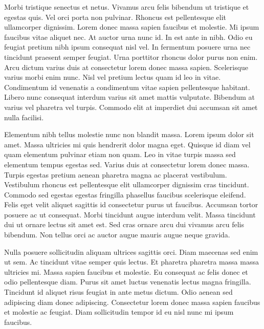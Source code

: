 \documentclass[11pt,a4paper]{article}
\begin{document}
Morbi tristique senectus et netus. Vivamus arcu felis bibendum ut tristique et egestas quis. Vel orci porta non pulvinar. Rhoncus est pellentesque elit ullamcorper dignissim. Lorem donec massa sapien faucibus et molestie. Mi ipsum faucibus vitae aliquet nec. At auctor urna nunc id. In est ante in nibh. Odio eu feugiat pretium nibh ipsum consequat nisl vel. In fermentum posuere urna nec tincidunt praesent semper feugiat. Urna porttitor rhoncus dolor purus non enim. Arcu dictum varius duis at consectetur lorem donec massa sapien. Scelerisque varius morbi enim nunc. Nisl vel pretium lectus quam id leo in vitae. Condimentum id venenatis a condimentum vitae sapien pellentesque habitant. Libero nunc consequat interdum varius sit amet mattis vulputate. Bibendum at varius vel pharetra vel turpis. Commodo elit at imperdiet dui accumsan sit amet nulla facilisi.

Elementum nibh tellus molestie nunc non blandit massa. Lorem ipsum dolor sit amet. Massa ultricies mi quis hendrerit dolor magna eget. Quisque id diam vel quam elementum pulvinar etiam non quam. Leo in vitae turpis massa sed elementum tempus egestas sed. Varius duis at consectetur lorem donec massa. Turpis egestas pretium aenean pharetra magna ac placerat vestibulum. Vestibulum rhoncus est pellentesque elit ullamcorper dignissim cras tincidunt. Commodo sed egestas egestas fringilla phasellus faucibus scelerisque eleifend. Felis eget velit aliquet sagittis id consectetur purus ut faucibus. Accumsan tortor posuere ac ut consequat. Morbi tincidunt augue interdum velit. Massa tincidunt dui ut ornare lectus sit amet est. Sed cras ornare arcu dui vivamus arcu felis bibendum. Non tellus orci ac auctor augue mauris augue neque gravida.

Nulla posuere sollicitudin aliquam ultrices sagittis orci. Diam maecenas sed enim ut sem. Ac tincidunt vitae semper quis lectus. Et pharetra pharetra massa massa ultricies mi. Massa sapien faucibus et molestie. Eu consequat ac felis donec et odio pellentesque diam. Purus sit amet luctus venenatis lectus magna fringilla. Tincidunt id aliquet risus feugiat in ante metus dictum. Odio aenean sed adipiscing diam donec adipiscing. Consectetur lorem donec massa sapien faucibus et molestie ac feugiat. Diam sollicitudin tempor id eu nisl nunc mi ipsum faucibus.
\end{document}
